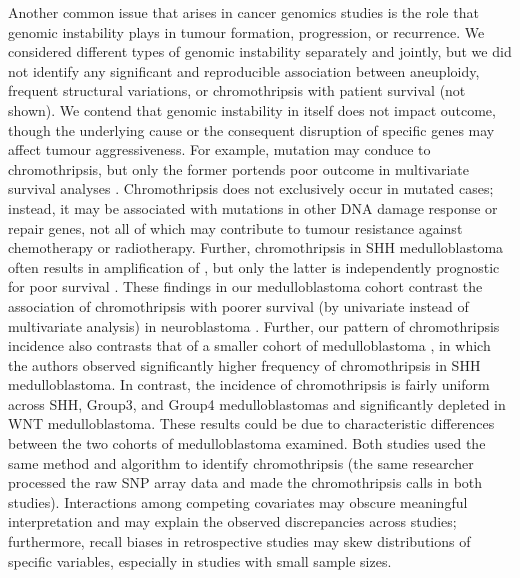 Another common issue that arises in cancer genomics studies is the role that genomic instability plays in tumour formation, progression, or recurrence. We considered different types of genomic instability separately and jointly, but we did not identify any significant and reproducible association between aneuploidy, frequent structural variations, or chromothripsis with patient survival (not shown). We contend that genomic instability in itself does not impact outcome, though the underlying cause or the consequent disruption of specific genes may affect tumour aggressiveness. For example,  mutation may conduce to chromothripsis, but only the former portends poor outcome in multivariate survival analyses . Chromothripsis does not exclusively occur in  mutated cases; instead, it may be associated with mutations in other DNA damage response or repair genes, not all of which may contribute to tumour resistance against chemotherapy or radiotherapy. Further, chromothripsis in SHH medulloblastoma often results in amplification of , but only the latter is independently prognostic for poor survival . These findings in our medulloblastoma cohort contrast the association of chromothripsis with poorer survival (by univariate instead of multivariate analysis) in neuroblastoma . Further, our pattern of chromothripsis incidence also contrasts that of a smaller cohort of medulloblastoma , in which the authors observed significantly higher frequency of chromothripsis in SHH medulloblastoma. In contrast, the incidence of chromothripsis is fairly uniform across SHH, Group3, and Group4 medulloblastomas and significantly depleted in WNT medulloblastoma. These results could be due to characteristic differences between the two cohorts of medulloblastoma examined. Both studies used the same method and algorithm to identify chromothripsis (the same researcher processed the raw SNP array data and made the chromothripsis calls in both studies). Interactions among competing covariates may obscure meaningful interpretation and may explain the observed discrepancies across studies; furthermore, recall biases in retrospective studies may skew distributions of specific variables, especially in studies with small sample sizes.

